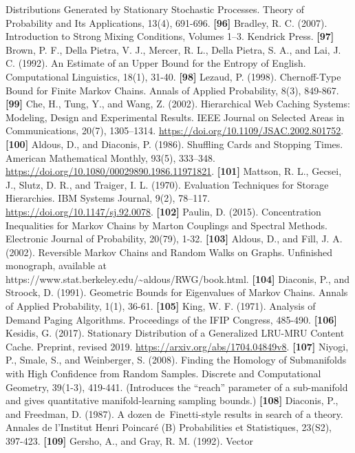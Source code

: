 \documentclass[
]{article}
\begin{document}
Distributions Generated by Stationary Stochastic Processes. Theory
of Probability and Its Applications, 13(4), 691-696.
\textbf{{[}96{]}} Bradley, R. C. (2007). Introduction to Strong
Mixing Conditions, Volumes 1--3. Kendrick Press.
\textbf{{[}97{]}} Brown, P. F., Della Pietra, V. J., Mercer,
R. L., Della Pietra, S. A., and Lai, J. C. (1992). An Estimate of
an Upper Bound for the Entropy of English. Computational Linguistics,
18(1), 31-40.
\textbf{{[}98{]}} Lezaud, P. (1998). Chernoff-Type Bound for Finite
Markov Chains. Annals of Applied Probability, 8(3), 849-867.
\textbf{{[}99{]}} Che, H., Tung, Y., and Wang,
Z. (2002). Hierarchical Web Caching Systems: Modeling, Design and
Experimental Results. IEEE Journal on Selected Areas in Communications,
20(7), 1305--1314. \url{https://doi.org/10.1109/JSAC.2002.801752}.
\textbf{{[}100{]}} Aldous, D., and
Diaconis, P. (1986). Shuffling Cards and Stopping Times. American
Mathematical Monthly, 93(5), 333--348.
\url{https://doi.org/10.1080/00029890.1986.11971821}.
\textbf{{[}101{]}} Mattson, R. L., Gecsei, J., Slutz,
D. R., and Traiger, I. L. (1970). Evaluation Techniques for Storage
Hierarchies. IBM Systems Journal, 9(2), 78--117.
\url{https://doi.org/10.1147/sj.92.0078}.
\textbf{{[}102{]}} Paulin, D. (2015). Concentration Inequalities
for Markov Chains by Marton Couplings and Spectral Methods.
Electronic Journal of Probability, 20(79), 1-32.
\textbf{{[}103{]}} Aldous, D., and Fill, J. A. (2002).
Reversible Markov Chains and Random Walks on Graphs.
Unfinished monograph, available at
https://www.stat.berkeley.edu/\textasciitilde aldous/RWG/book.html.
\textbf{{[}104{]}} Diaconis, P., and Stroock, D. (1991). Geometric
Bounds for Eigenvalues of Markov Chains. Annals of Applied
Probability, 1(1), 36-61.
\textbf{{[}105{]}} King, W. F. (1971). Analysis of Demand Paging
Algorithms. Proceedings of the IFIP Congress, 485-490.
\textbf{{[}106{]}} Kesidis, G. (2017). Stationary Distribution of a
Generalized LRU-MRU Content Cache. Preprint, revised 2019.
\url{https://arxiv.org/abs/1704.04849v8}.
\textbf{{[}107{]}} Niyogi, P., Smale, S., and Weinberger, S. (2008).
Finding the Homology of Submanifolds with High Confidence from
Random Samples. Discrete and Computational Geometry, 39(1-3),
419-441. (Introduces the ``reach'' parameter of a sub-manifold and
gives quantitative manifold-learning sampling bounds.)
\textbf{{[}108{]}} Diaconis, P., and Freedman, D. (1987).
A dozen de~Finetti-style results in search of a theory. Annales de
l'Institut Henri Poincar\'e (B) Probabilities et Statistiques, 23(S2),
397-423.
\textbf{{[}109{]}} Gersho, A., and Gray, R. M. (1992). Vector
\end{document}
